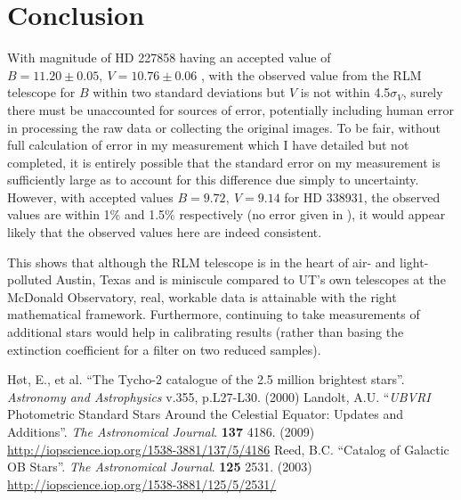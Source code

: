 \documentclass{article}
\begin{document}
\section{Conclusion}
With magnitude of HD 227858 having an accepted value of $B=11.20\pm0.05,~V=10.76\pm0.06$ \cite{hd2}, with the observed value from the RLM
telescope for $B$ within two standard deviations but $V$ is not within 4.5$\sigma_V$, surely there must be unaccounted for sources of error,
potentially including human error in processing the raw data or collecting the original images. To be fair, without full calculation
of error in my measurement which I have detailed but not completed, it is entirely possible that the standard error on my measurement
is sufficiently large as to account for this difference due simply to uncertainty. However, with accepted values $B=9.72,~V=9.14$\cite{hd3}
for HD 338931, the observed values are within 1\% and 1.5\% respectively (no error given in \cite{hd3}), it would appear likely that
the observed values here are indeed consistent.

This shows that although the RLM telescope is in the heart of air- and light-polluted Austin, Texas and is miniscule compared to UT's own
telescopes at the McDonald Observatory, real, workable data is attainable with the right mathematical framework. Furthermore, continuing
to take measurements of additional stars would help in calibrating results (rather than basing the extinction coefficient for a filter
on two reduced samples).

\begin{thebibliography}{9}
 H\o{t}, E., et al. ``The Tycho-2 catalogue of the 2.5 million brightest stars''. {\emph{Astronomy and Astrophysics}} v.355, p.L27-L30. (2000)
 Landolt, A.U. ``{\emph{UBVRI}} Photometric Standard Stars Around the Celestial Equator: Updates and Additions''. {\emph{The
Astronomical Journal}}. {\bf{137}} 4186. (2009) \url{http://iopscience.iop.org/1538-3881/137/5/4186}
 Reed, B.C. ``Catalog of Galactic OB Stars''. {\emph{The Astronomical Journal}}. {\bf{125}} 2531. (2003)
\url{http://iopscience.iop.org/1538-3881/125/5/2531/}

\end{thebibliography}
\end{document}

